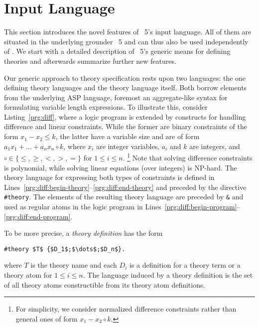
\section{Input Language}\label{sec:language}

This section introduces the novel features of \clingo~5's input language.
All of them are situated in the underlying grounder \gringo~5 and can thus
also be used independently of \clingo.
%
We start with a detailed description of \gringo~5's generic means for defining theories
and afterwards summarize further %
new features.

Our generic approach to theory specification rests upon two languages:
the one defining theory languages and the theory language itself.
Both borrow elements from the underlying ASP language,
foremost an aggregate-like syntax for formulating variable length expressions.
To illustrate this, consider Listing~\ref{prg:diff},
where a logic program is extended by constructs for handling difference and linear constraints.
While the former are binary constraints of the form $x_1-x_2\leq k$, %
the latter have a variable size and are of form
\(
a_1x_1+\dots+a_nx_n\circ k
\),
where $x_i$ are integer variables, $a_i$ and $k$ are integers, and $\circ\in\{\leq,\geq,<,>,=\}$
for $1\leq i\leq n$.%
\footnote{For simplicity, we consider normalized difference constraints rather than general ones of form $x_1-x_2\circ k$.}
Note that solving difference constraints is polynomial, while solving linear equations (over integers) is NP-hard.
The theory language for expressing both types of constraints is defined in Lines~\ref{prg:diff:begin-theory}--\ref{prg:diff:end-theory} and preceded by the directive \lstinline{#theory}.
The elements of the resulting theory language are preceded by \lstinline{&} and used as regular atoms in the logic program in Lines~\ref{prg:diff:begin-program}--\ref{prg:diff:end-program}.


To be more precise,
a \emph{theory definition} has the form
\begin{lstlisting}[numbers=none,mathescape=t]
#theory $T$ {$D_1$;$\dots$;$D_n$}.
\end{lstlisting}
where $T$ is the theory name and each $D_i$ is a definition for a theory term or a theory atom for $1\leq i\leq n$.
The language induced by a theory definition is the set of all theory atoms constructible from its theory atom definitions.

